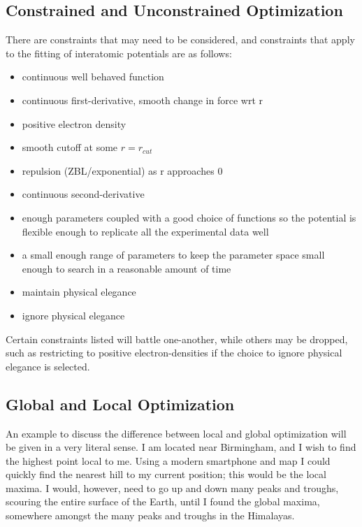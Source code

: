 \subsection{Constrained and Unconstrained Optimization}

There are constraints that may need to be considered, and constraints that apply to the fitting of interatomic potentials are as follows:

\begin{itemize}
\item continuous well behaved function
\item continuous first-derivative, smooth change in force wrt r
\item positive electron density
\item smooth cutoff at some $r = r_{cut}$
\item repulsion (ZBL/exponential) as r approaches 0
\item continuous second-derivative
\item enough parameters coupled with a good choice of functions so the potential is flexible enough to replicate all the experimental data well
\item a small enough range of parameters to keep the parameter space small enough to search in a reasonable amount of time
\item maintain physical elegance
\item ignore physical elegance
\end{itemize}

Certain constraints listed will battle one-another, while others may be dropped, such as restricting to positive electron-densities if the choice to ignore physical elegance is selected. 


\FloatBarrier
\subsection{Global and Local Optimization}

An example to discuss the difference between local and global optimization will be given in a very literal sense.  I am located near Birmingham, and I wish to find the highest point local to me.  Using a modern smartphone and map I could quickly find the nearest hill to my current position; this would be the local maxima.  I would, however, need to go up and down many peaks and troughs, scouring the entire surface of the Earth, until I found the global maxima, somewhere amongst the many peaks and troughs in the Himalayas. 

